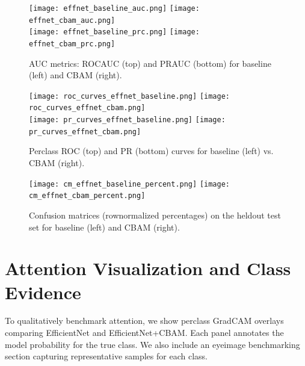 \begin{figure}[t]
  \centering
  \texttt{[image: effnet\_baseline\_auc.png]}
  \texttt{[image: effnet\_cbam\_auc.png]}\\
  \texttt{[image: effnet\_baseline\_prc.png]}
  \texttt{[image: effnet\_cbam\_prc.png]}
  \caption{AUC metrics: ROC\textendash AUC (top) and PR\textendash AUC (bottom) for baseline (left) and CBAM (right).}
  \label{fig:auc_curves}
\end{figure}

\begin{figure}[t]
  \centering
  \texttt{[image: roc\_curves\_effnet\_baseline.png]}
  \texttt{[image: roc\_curves\_effnet\_cbam.png]}\\
  \texttt{[image: pr\_curves\_effnet\_baseline.png]}
  \texttt{[image: pr\_curves\_effnet\_cbam.png]}
  \caption{Per\textendash class ROC (top) and PR (bottom) curves for baseline (left) vs. CBAM (right).}
  \label{fig:perclass_curves}
\end{figure}

\begin{figure}[t]
  \centering
  \texttt{[image: cm\_effnet\_baseline\_percent.png]}
  \texttt{[image: cm\_effnet\_cbam\_percent.png]}
  \caption{Confusion matrices (row\textendash normalized percentages) on the held\textendash out test set for baseline (left) and CBAM (right).}
  \label{fig:cms}
\end{figure}

\section{Attention Visualization and Class Evidence}
To qualitatively benchmark attention, we show per\textendash class Grad\textendash CAM overlays comparing EfficientNet and EfficientNet+CBAM. Each panel annotates the model probability for the true class. We also include an eye\textendash image benchmarking section capturing representative samples for each class.

